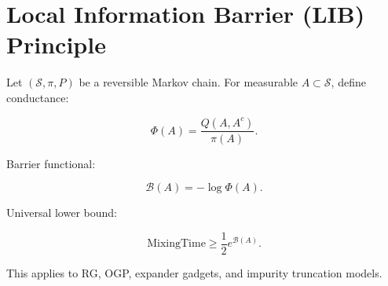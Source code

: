 \section*{Local Information Barrier (LIB) Principle}

Let $(\mathcal S,\pi,P)$ be a reversible Markov chain.
For measurable $A \subset \mathcal S$, define conductance:

\[
\Phi(A) = \frac{Q(A,A^c)}{\pi(A)}.
\]

Barrier functional:

\[
\mathcal B(A) = -\log \Phi(A).
\]

Universal lower bound:

\[
\mathrm{MixingTime} \ge \frac12 e^{\mathcal B(A)}.
\]

This applies to RG, OGP, expander gadgets, and impurity truncation models.
